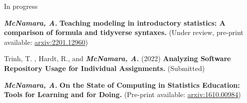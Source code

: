 \documentclass{resume} %
\begin{document}

\begin{rSection}{In progress}

{\bf \em McNamara, A.} {\bf Teaching modeling in introductory statistics: A comparison of formula and tidyverse syntaxes.} (Under review, pre-print available: \href{https://arxiv.org/abs/2201.12960}{arxiv:2201.12960})

Trinh, T. \footnotemark[1], Hardt, R., and {\bf \em McNamara, A.} (2022) {\bf Analyzing Software Repository Usage for Individual Assignments.} (Submitted)

{\bf \em{McNamara, A.}} {\bf On the State of Computing in Statistics Education: Tools for Learning and for Doing. } (Pre-print available: \href{https://arxiv.org/abs/1610.00984}{arxiv:1610.00984})


% 

\end{rSection}


\end{document}
